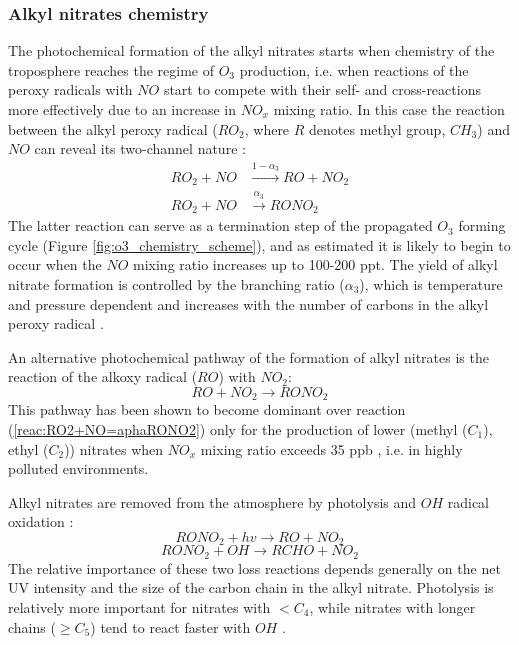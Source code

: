 \documentclass[11pt,a4paper]{article}
\begin{document}
\subsubsection*{Alkyl nitrates chemistry} \label{into_ANchem}
The photochemical formation of the alkyl nitrates starts when chemistry of the troposphere reaches the regime of $O_3$ production, i.e. when reactions of the peroxy radicals with $NO$ start to compete with their self- and cross-reactions more effectively due to an increase in $NO_x$ mixing ratio. In this case the reaction between the alkyl peroxy radical ($RO_2$, where $R$ denotes methyl group, $CH_3$) and $NO$ can reveal its two-channel nature \citep{Day2003}:
\begin{subequations} \label{reac:RONO2alpha}
\begin{align}
RO_2 + NO &\xrightarrow{1-\alpha_3} RO + NO_2 \label{reac:RO2+NO=aphaRO+NO2}\\
RO_2 + NO &\xrightarrow{\alpha_3} RONO_2 \label{reac:RO2+NO=aphaRONO2}
\end{align}
\end{subequations}
The latter reaction can serve as a termination step of the propagated $O_3$ forming cycle (Figure \ref{fig:o3_chemistry_scheme}), and as \cite{Roberts1998} estimated it is likely to begin to occur when the $NO$ mixing ratio increases up to 100-200 ppt. The yield of alkyl nitrate formation is controlled by the branching ratio ($\alpha_3$), which is temperature and pressure dependent and increases with the number of carbons in the alkyl peroxy radical \citep{Roberts1990}.

An alternative photochemical pathway of the formation of alkyl nitrates is the reaction of the alkoxy radical ($RO$) with $NO_2$:
\begin{equation} \label{reac:RO+NO2=RONO2}
RO + NO_2 \rightarrow RONO_2
\end{equation}
This pathway has been shown to become dominant over reaction (\ref{reac:RO2+NO=aphaRONO2}) only for the production of lower (methyl ($C_1$), ethyl ($C_2$)) nitrates when $NO_x$ mixing ratio exceeds 35 ppb \citep{Archibald2007}, i.e. in highly polluted environments.

Alkyl nitrates are removed from the atmosphere by photolysis \citep{Turberg1990} and $OH$ radical oxidation \citep{Talukdar1997}:
\begin{equation} \label{reac:RONO2+hv=RO+NO2}
RONO_2 + hv \rightarrow RO + NO_2
\end{equation}
\begin{equation} \label{reac:RONO2+OH=RCHO+NO2}
RONO_2 + OH \rightarrow RCHO + NO_2
\end{equation}
The relative importance of these two loss reactions depends generally on the net UV intensity and the size of the carbon chain in the alkyl nitrate. Photolysis is relatively more important for nitrates with $< C_4$, while nitrates with longer chains ($\geq C_5$) tend to react faster with $OH$ \citep{Worton2010}.
\end{document}
